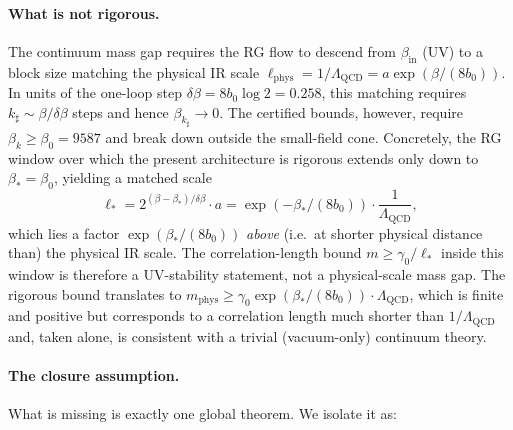 \documentclass[11pt]{article}
\theoremstyle{definition}
\newcommand{\Lam}{\Lambda_{\mathrm{QCD}}}
\begin{document}
\paragraph{What is not rigorous.}
The continuum mass gap requires the RG flow to descend from
$\beta_{\mathrm{in}}$ (UV) to a block size matching the physical
IR scale $\ell_{\mathrm{phys}}=1/\Lam=a\exp(\beta/(8b_0))$.  In
units of the one-loop step $\delta\beta=8b_0\log 2=0.258$, this
matching requires $k_\sharp\sim\beta/\delta\beta$ steps and
hence $\beta_{k_\sharp}\to 0$.  The certified bounds, however,
require $\beta_k\ge\beta_0=9587$ and break down outside the
small-field cone.  Concretely, the RG window over which the
present architecture is rigorous extends only down to
$\beta_*=\beta_0$, yielding a matched scale
\[
\ell_*=2^{(\beta-\beta_*)/\delta\beta}\cdot a
=\exp(-\beta_*/(8b_0))\cdot\frac{1}{\Lam},
\]
which lies a factor $\exp(\beta_*/(8b_0))$ \emph{above} (i.e.\ at
shorter physical distance than) the physical IR scale.  The
correlation-length bound $m\ge\gamma_0/\ell_*$ inside this window
is therefore a UV-stability statement, not a physical-scale mass
gap.  The rigorous bound translates to
$m_{\mathrm{phys}}\ge\gamma_0\exp(\beta_*/(8b_0))\cdot\Lam$, which
is finite and positive but corresponds to a correlation length
much shorter than $1/\Lam$ and, taken alone, is consistent with a
trivial (vacuum-only) continuum theory.

\paragraph{The closure assumption.}
What is missing is exactly one global theorem.  We isolate it as:
\end{document}
